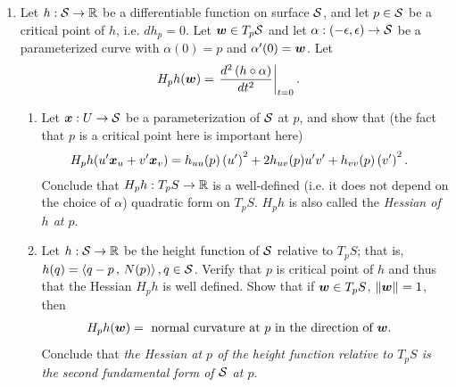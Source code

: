 \documentclass[11pt]{article}
\begin{document}
\begin{enumerate}
\item \begin{example}
Let $h: {\mathcal S} \rightarrow {\mathbb R}$ be a differentiable function on surface ${\mathcal S}$, and let $p\in {\mathcal S}$ be a critical point of $h$, i.e. $dh_{p} = 0$. Let $\boldsymbol{w}\in T_{p}{\mathcal S}$ and let $\alpha: (-\epsilon, \epsilon) \rightarrow {\mathcal S}$ be a parameterized curve with $\alpha(0) = p$ and $\alpha'(0)= \boldsymbol{w}$. Let 
\begin{align*}
H_{p}h(\boldsymbol{w}) &= \left.{\frac{d^{2} \left(h\circ \alpha\right)}{dt^{2}}}\right\vert_{t=0}.
\end{align*}   
\begin{enumerate}
\item Let $\boldsymbol{x}: U\rightarrow {\mathcal S}$ be a parameterization of ${\mathcal S}$ at $p$, and show that (the fact that $p$ is a critical point here is important here)
\begin{align*}
H_{p}h(u'\boldsymbol{x}_{u}+ v'\boldsymbol{x}_{v}) &= h_{uu}(p)\left(u'\right)^{2} + 2h_{uv}(p)u'v'+ h_{vv}(p)\left(v'\right)^{2}.
\end{align*}
Conclude that $H_{p}h: T_{p}S \rightarrow {\mathbb R}$ is a well-defined (i.e. it does not depend on the choice of $\alpha$) quadratic form on $T_{p}S$. $H_{p}h$ is also called the \emph{Hessian of $h$ at $p$}.\\[5pt]

\item Let $h: {\mathcal S} \rightarrow {\mathbb R}$ be the height function of ${\mathcal S}$ relative to $T_{p}S$; that is, $h(q)= \left\langle q-p\,,\, N(p) \right\rangle, q\in 
{\mathcal S}$. Verify that $p$ is critical point of $h$ and thus that the Hessian $H_{p}h$ is well defined. Show that if $\boldsymbol{w}\in T_{p}S$, $\left\|\boldsymbol{w}\right\|_{} = 1$, then 
\begin{align*}
H_{p}h(\boldsymbol{w}) &= \text{ normal curvature at }p\text{ in the direction of }\boldsymbol{w}.
\end{align*}
Conclude that \emph{the Hessian at $p$ of the height function relative to $T_{p}S$ is the second fundamental form of ${\mathcal S}$ at $p$}.
\end{enumerate}
\end{example}
\begin{solution}
\end{solution}
\end{enumerate}

\newpage


\end{document}
